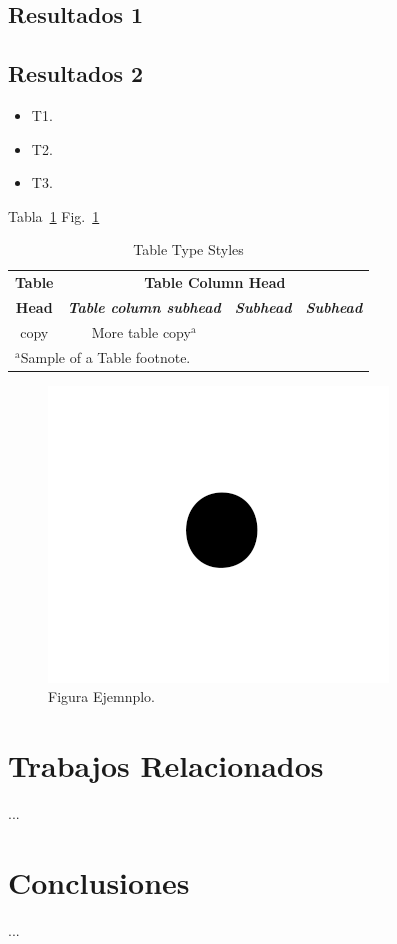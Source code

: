 \documentclass[conference]{IEEEtran}
\begin{document}
\subsection{Resultados 1}

\subsection{Resultados 2}

\begin{itemize}
    \item T1.
    \item T2.
    \item T3.
\end{itemize}

Tabla~\ref{tab:1}
Fig.~\ref{fig:1}

\begin{table}[htbp]
    \caption{Table Type Styles}
    \begin{center}
        \begin{tabular}{|c|c|c|c|}
            \hline
            \textbf{Table}            & \multicolumn{3}{|c|}{\textbf{Table
                    Column Head}}
            \\
            \cline{2-4}
            \textbf{Head}             & \textbf{\textit{Table column subhead}}
                                      &
            \textbf{\textit{Subhead}} & \textbf{\textit{Subhead}}
            \\
            \hline
            copy                      & More table copy$^{\mathrm{a}}$
                                      &
                                      &
            \\
            \hline
            \multicolumn{4}{l}{$^{\mathrm{a}}$Sample of a Table footnote.}
        \end{tabular}
        \label{tab:1}
    \end{center}
\end{table}

\begin{figure}[htbp]
    \centerline{\includegraphics{Figures/fig1.png}}
    \caption{Figura Ejemnplo.}
    \label{fig:1}
\end{figure}

\section{Trabajos Relacionados}
\label{sec:TR}
...

\section{Conclusiones}
\label{sec:Conclusiones}
...



\end{document}
